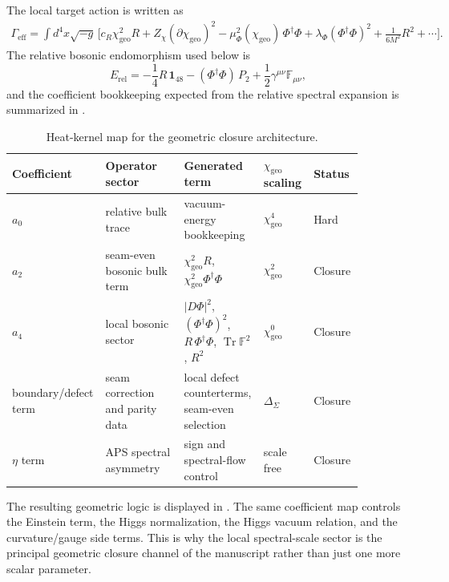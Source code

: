 \documentclass[11pt,a4paper]{article}
\theoremstyle{definition}
\theoremstyle{remark}
\DeclareMathOperator{\tr}{Tr}
\newcommand{\Seam}{\Sigma}
\newcommand{\Gammaeff}{\Gamma_{\mathrm{eff}}}
\newcommand{\chigeo}{\chi_{\mathrm{geo}}}
\begin{document}
The local target action is written as
\begin{equation}
\label{eq:chi-effective-action}
\begin{aligned}
\Gammaeff
=
\int d^4x\sqrt{-g}\,
\Big[
c_R\chigeo^2R
+Z_\chi(\partial\chigeo)^2
-\mu_\Phi^2(\chigeo)\,\Phi^\dagger\Phi
+\lambda_\Phi(\Phi^\dagger\Phi)^2
+\frac{1}{6M^2}R^2
+\cdots
\Big].
\end{aligned}
\end{equation}
The relative bosonic endomorphism used below is
\begin{equation}
\label{eq:relative-bosonic-endomorphism}
E_{\mathrm{rel}}
=
-\frac14 R\,\mathbf 1_{48}
-
(\Phi^\dagger\Phi)\,P_2
+
\frac12\gamma^{\mu\nu}\mathbb F_{\mu\nu},
\end{equation}
and the coefficient bookkeeping expected from the relative spectral expansion is summarized in .

\begin{table}[t]
\centering
\small
\begin{tabularx}{\linewidth}{@{}>{\raggedright\arraybackslash}p{0.15\linewidth}>{\raggedright\arraybackslash}p{0.22\linewidth}>{\raggedright\arraybackslash}p{0.22\linewidth}>{\raggedright\arraybackslash}p{0.14\linewidth}>{\raggedright\arraybackslash}p{0.14\linewidth}@{}}
\toprule
Coefficient & Operator sector & Generated term & $\chigeo$ scaling & Status \\
\midrule
$a_0$ & relative bulk trace & vacuum-energy bookkeeping & $\chigeo^4$ & Hard \\
$a_2$ & seam-even bosonic bulk term & $\chigeo^2R$, $\chigeo^2\Phi^\dagger\Phi$ & $\chigeo^2$ & Closure \\
$a_4$ & local bosonic sector & $|D\Phi|^2$, $(\Phi^\dagger\Phi)^2$, $R\,\Phi^\dagger\Phi$, $\tr\mathbb F^2$, $R^2$ & $\chigeo^0$ & Closure \\
boundary/defect term & seam correction and parity data & local defect counterterms, seam-even selection & $\Delta_{\Seam}$ & Closure \\
$\eta$ term & APS spectral asymmetry & sign and spectral-flow control & scale free & Closure \\
\bottomrule
\end{tabularx}
\caption{Heat-kernel map for the geometric closure architecture.}
\label{tab:heat-kernel-map}
\end{table}

The resulting geometric logic is displayed in . The same coefficient map controls the Einstein term, the Higgs normalization, the Higgs vacuum relation, and the curvature/gauge side terms. This is why the local spectral-scale sector is the principal geometric closure channel of the manuscript rather than just one more scalar parameter.
\end{document}
